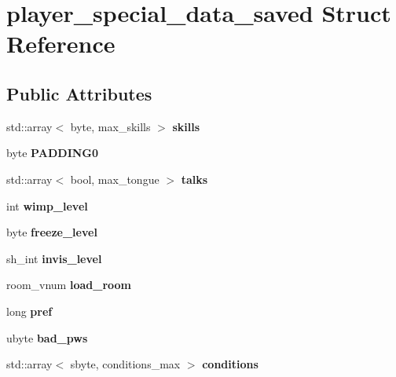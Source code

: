 \hypertarget{structplayer__special__data__saved}{}\section{player\+\_\+special\+\_\+data\+\_\+saved Struct Reference}
\label{structplayer__special__data__saved}
\subsection*{Public Attributes}
\begin{DoxyCompactItemize}
\item 
\mbox{\label{structplayer__special__data__saved_adccf29d628a93a48ae158555b6ed47be}} 
std\+::array$<$ byte, max\+\_\+skills $>$ {\bfseries skills}
\item 
\mbox{\label{structplayer__special__data__saved_a6be2949a1e5fe3daae08a980797012c7}} 
byte {\bfseries P\+A\+D\+D\+I\+N\+G0}
\item 
\mbox{\label{structplayer__special__data__saved_aacf9d5f56e399d87c8dbaf5df0f4974e}} 
std\+::array$<$ bool, max\+\_\+tongue $>$ {\bfseries talks}
\item 
\mbox{\label{structplayer__special__data__saved_a9adeb0bb348924699c81c5025a63a387}} 
int {\bfseries wimp\+\_\+level}
\item 
\mbox{\label{structplayer__special__data__saved_a011dd17979dab1200c2e5d9d3ba6f371}} 
byte {\bfseries freeze\+\_\+level}
\item 
\mbox{\label{structplayer__special__data__saved_acd10d50dc4b25c3509b2018a18d58fed}} 
sh\+\_\+int {\bfseries invis\+\_\+level}
\item 
\mbox{\label{structplayer__special__data__saved_a4317323869b447ccb2907865a902b6ee}} 
room\+\_\+vnum {\bfseries load\+\_\+room}
\item 
\mbox{\label{structplayer__special__data__saved_a64d1d7816a437dbdabdcdfa10607f4c0}} 
long {\bfseries pref}
\item 
\mbox{\label{structplayer__special__data__saved_a1da250ee8f8bf3bc5915e4ccee90a7d2}} 
ubyte {\bfseries bad\+\_\+pws}
\item 
\mbox{\label{structplayer__special__data__saved_a566e5be78a57cab158a5eb4ec6b82de9}} 
std\+::array$<$ sbyte, conditions\+\_\+max $>$ {\bfseries conditions}
\end{DoxyCompactItemize}
